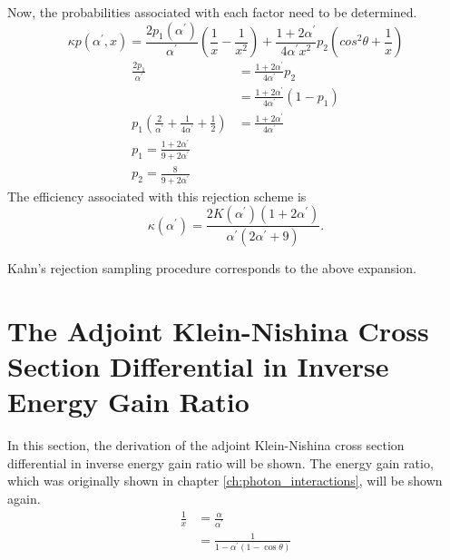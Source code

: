 Now, the probabilities associated with each factor need to be determined.
\begin{equation*}
  \kappa p(\alpha^{'},x) = \frac{2 p_1(\alpha^{'})}{\alpha^{'}}
  \left(\frac{1}{x} - \frac{1}{x^2}\right) + 
  \frac{1+2\alpha^{'}}{4\alpha^{'}x^2}p_2 \left(cos^2\theta + \frac{1}{x}\right)
\end{equation*}
\begin{align}
  \frac{2p_1}{\alpha^{'}} & = \frac{1+2\alpha^{'}}{4\alpha^{'}}p_2 \nonumber \\
  & = \frac{1+2\alpha^{'}}{4\alpha^{'}}(1-p_1) \nonumber \\
  p_1\left(\frac{2}{\alpha^{'}} + \frac{1}{4\alpha^{'}} + \frac{1}{2} \right)
  & = \frac{1+2\alpha^{'}}{4\alpha^{'}} \nonumber \\
  p_1 = \frac{1+2\alpha^{'}}{9 + 2\alpha^{'}} \\
  p_2 = \frac{8}{9 + 2\alpha^{'}}
\end{align}
The efficiency associated with this rejection scheme is
\begin{equation}
  \kappa(\alpha^{'}) = \frac{2 K(\alpha^{'})(1+2\alpha^{'})}
  {\alpha^{'}(2\alpha^{'}+9)}.
\end{equation}

Kahn's rejection sampling procedure corresponds to the above expansion.
  
\section{The Adjoint Klein-Nishina Cross Section Differential in Inverse Energy Gain Ratio}
In this section, the derivation of the adjoint Klein-Nishina cross section
differential in inverse energy gain ratio will be shown. The energy gain
ratio, which was originally shown in chapter \ref{ch:photon_interactions}, 
will be shown again.
\begin{align}
  \frac{1}{x} & = \frac{\alpha}{\alpha^{'}} \nonumber \\
  & = \frac{1}{1 - \alpha^{'}(1-\cos{\theta})} \nonumber
\end{align}

